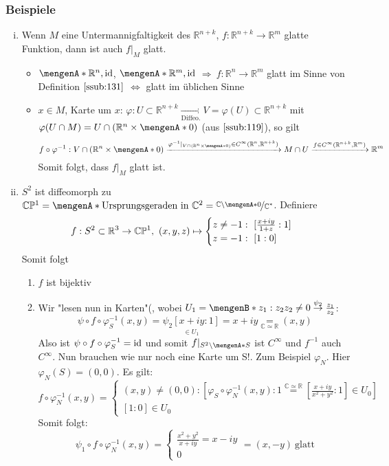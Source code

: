 \subsubsection{Beispiele}
\label{ssub:120}
\begin{enumerate}[(i)]
\item Wenn $M$ eine Untermannigfaltigkeit des $\mathds{R}^{n+k}$, $f:\mathds{R}^{n+k}\to \mathds{R}^m$ glatte Funktion, dann ist auch $f\vert_M$ glatt.
\begin{itemize}
\item $\set{\mathds{R}^n,\id}$, $\set{\mathds{R}^m,\id}$ $\Rightarrow\ f:\mathds{R}^n\to \mathds{R}^m$ glatt im Sinne von Definition $\ref{ssub:131}$ $\Leftrightarrow$ glatt im üblichen Sinne
\item $x\in M$, Karte um $x$: $\varphi: U\subset \mathds{R}^{n+k} \underset{\text{Diffeo.}}{\to} V = \varphi(U)\subset \mathds{R}^{n+k}$ mit $\varphi(U\cap M) = U\cap (\mathds{R}^n\times \set{0})$ (aus $\ref{ssub:119}$), so gilt
\[
f\circ \varphi^{-1}: V\cap (\mathds{R}^n\times \set{0}) \xrightarrow{\varphi^{-1} \vert_{V\cap (\mathds{R}^n\times \set{0})}\in C^{\infty}(\mathds{R}^n,\mathds{R}^{n+k})} 
M\cap U \xrightarrow{f \in C^{\infty}(\mathds{R}^{n+k},\mathds{R}^m)} \mathds{R}^m
\]
Somit folgt, dass $f\vert_M$ glatt ist. 
\end{itemize}
\item $S^2$ ist diffeomorph zu $\mathds{C}\mathds{P}^1 = \set{\text{Ursprungsgeraden in}\ \mathds{C}^2} = \nicefrac{\mathds{C}\backslash \set{0}}{\mathds{C}^*}$. Definiere 
\[
f: S^2\subset \mathbb{R}^3 \to \mathbb{C}\mathbb{P}^1,\ (x,y,z) \mapsto
\begin{cases}
z\neq -1:\ [\frac{x+iy}{1+z}:1]\\
z = -1:\ [1:0]
\end{cases}
\]
Somit folgt
\begin{enumerate}[(1)]
\item $f$ ist bijektiv
\item Wir "lesen nun in Karten"(, wobei $U_1 = \set[ z_1:z_2 ]{z_2\neq 0} \overset{\psi_2}{\to} \frac{z_1}{z_2}$:
\[
\psi \circ f \circ \varphi_S^{-1}(x,y) = \underset{\in U_1}{\psi_2 [x+iy:1]} = x + iy \underset{\mathds{C} \simeq \mathds{R}}{=} (x,y)
\]
Also ist $\psi \circ f \circ \varphi_S^{-1} = \operatorname{id}$ und somit $f \vert_{S^2\backslash\set{S}}$ ist $C^{\infty}$ und $f^{-1}$ auch $C^{\infty}$. Nun brauchen wie nur noch eine Karte um S!. Zum Beispiel $\varphi_N$. Hier $\varphi_N(S) = (0,0)$. Es gilt:
\[
	f\circ \varphi_N^{-1}(x,y) = 
	\begin{cases}
		(x,y) \neq (0,0): [\varphi_S \circ \varphi_N^{-1}(x,y):1 \overset{\mathds{C} \simeq \mathds{R}}{=} [\frac{x+iy}{x^2+y^2}:1] \in U_0]\\
	[1:0] \in U_0 
	\end{cases}
\]
Somit folgt:
\[
	\psi_1 \circ f \circ \varphi_N^{-1}(x,y) =
	\begin{cases}
		\frac{x^2+y^2}{x+iy} = x-iy\\
		0
	\end{cases}
	= (x,-y)\ \text{glatt}
\]
\end{enumerate}
\end{enumerate}

